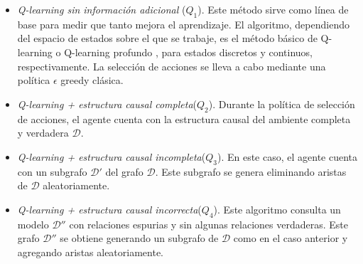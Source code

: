 \begin{itemize}
    \item \textit{Q-learning sin información adicional} ($Q_1$). Este método sirve como
    línea de base para medir que tanto mejora el aprendizaje. El algoritmo, dependiendo del espacio de estados sobre el que se trabaje, es el 
    método básico de Q-learning \cite{watkins1992q} o Q-learning profundo \cite{mnih2013playing}, para estados
    discretos y continuos, respectivamente. La selección de acciones se lleva a cabo mediante una política $\epsilon$ greedy clásica.
    \item \textit{Q-learning + estructura causal completa}($Q_2$). Durante la política de selección de acciones, el agente cuenta con la estructura causal del ambiente completa y verdadera $\mathcal{D}$.
    \item \textit{Q-learning + estructura causal incompleta}($Q_3$). En este caso, el agente cuenta con un subgrafo $\mathcal{D'}$ del grafo $\mathcal{D}$. Este subgrafo se genera eliminando aristas de $\mathcal{D}$ aleatoriamente.
    \item \textit{Q-learning + estructura causal incorrecta}($Q_4$). Este algoritmo consulta un modelo $\mathcal{D}''$ con relaciones espurias y sin algunas relaciones verdaderas. Este grafo $\mathcal{D}''$ se obtiene generando un subgrafo de $\mathcal{D}$ como en el caso anterior y agregando aristas aleatoriamente.
\end{itemize}

